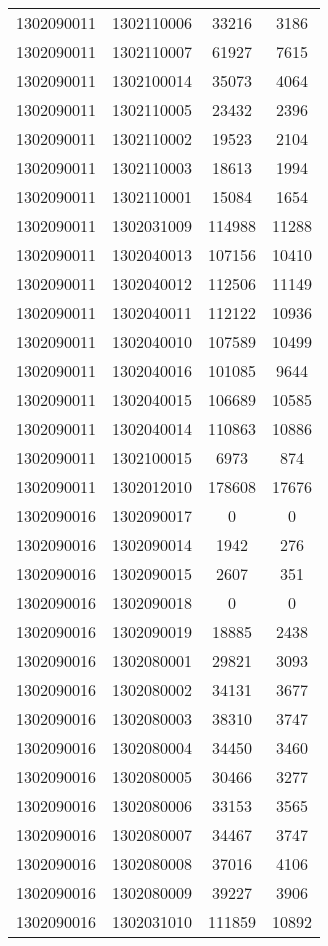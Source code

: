 \begin{longtable}[h]{llcc}
		1302090011 & 1302110006 & 33216 & 3186\\
		1302090011 & 1302110007 & 61927 & 7615\\
		1302090011 & 1302100014 & 35073 & 4064\\
		1302090011 & 1302110005 & 23432 & 2396\\
		1302090011 & 1302110002 & 19523 & 2104\\
		1302090011 & 1302110003 & 18613 & 1994\\
		1302090011 & 1302110001 & 15084 & 1654\\
		1302090011 & 1302031009 & 114988 & 11288\\
		1302090011 & 1302040013 & 107156 & 10410\\
		1302090011 & 1302040012 & 112506 & 11149\\
		1302090011 & 1302040011 & 112122 & 10936\\
		1302090011 & 1302040010 & 107589 & 10499\\
		1302090011 & 1302040016 & 101085 & 9644\\
		1302090011 & 1302040015 & 106689 & 10585\\
		1302090011 & 1302040014 & 110863 & 10886\\
		1302090011 & 1302100015 & 6973 & 874\\
		1302090011 & 1302012010 & 178608 & 17676\\
		1302090016 & 1302090017 & 0 & 0\\
		1302090016 & 1302090014 & 1942 & 276\\
		1302090016 & 1302090015 & 2607 & 351\\
		1302090016 & 1302090018 & 0 & 0\\
		1302090016 & 1302090019 & 18885 & 2438\\
		1302090016 & 1302080001 & 29821 & 3093\\
		1302090016 & 1302080002 & 34131 & 3677\\
		1302090016 & 1302080003 & 38310 & 3747\\
		1302090016 & 1302080004 & 34450 & 3460\\
		1302090016 & 1302080005 & 30466 & 3277\\
		1302090016 & 1302080006 & 33153 & 3565\\
		1302090016 & 1302080007 & 34467 & 3747\\
		1302090016 & 1302080008 & 37016 & 4106\\
		1302090016 & 1302080009 & 39227 & 3906\\
		1302090016 & 1302031010 & 111859 & 10892\\

\end{longtable}
